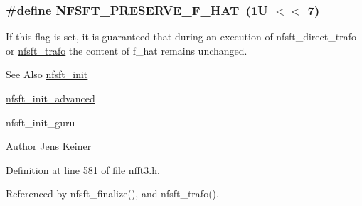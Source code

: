 \hypertarget{group__nfsft_gac8a292845f0bdec6b0d8ef6eb693a00e}{
\subsubsection[{N\-F\-S\-F\-T\-\_\-\-P\-R\-E\-S\-E\-R\-V\-E\-\_\-\-F\-\_\-\-H\-A\-T}]{\setlength{\rightskip}{0pt plus 5cm}\#define N\-F\-S\-F\-T\-\_\-\-P\-R\-E\-S\-E\-R\-V\-E\-\_\-\-F\-\_\-\-H\-A\-T~(1\-U $<$$<$ 7)}}\label{group__nfsft_gac8a292845f0bdec6b0d8ef6eb693a00e}
If this flag is set, it is guaranteed that during an execution of nfsft\-\_\-direct\-\_\-trafo or \hyperlink{group__nfsft_ga5796fc68c432d46dfcab7abd8c56ee22}{nfsft\-\_\-trafo} the content of {\ttfamily f\-\_\-hat} remains unchanged.

\begin{DoxySeeAlso}{See Also}
\hyperlink{group__nfsft_ga65cda3f4a3edc5eb39c697cf34b1f0b9}{nfsft\-\_\-init} 

\hyperlink{group__nfsft_ga2812aa5beba0eb7efd3072bf323a0155}{nfsft\-\_\-init\-\_\-advanced} 

nfsft\-\_\-init\-\_\-guru 
\end{DoxySeeAlso}
\begin{DoxyAuthor}{Author}
Jens Keiner 
\end{DoxyAuthor}


Definition at line 581 of file nfft3.\-h.



Referenced by nfsft\-\_\-finalize(), and nfsft\-\_\-trafo().

